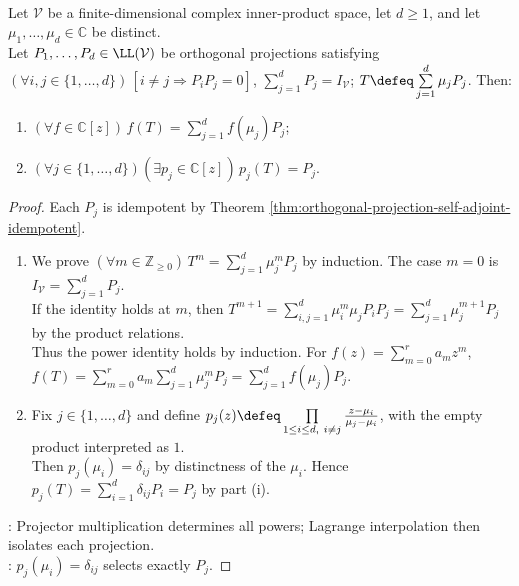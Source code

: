 \begin{corollary} \label{cor:normal-spectral-resolution-functional-calculus} \\
Let $\mathcal{V}$ be a finite-dimensional complex inner-product space, let $d\geq1$, and let $\mu_1,\ldots,\mu_d\in\mathbb{C}$ be distinct.\\
Let $P_1,\ldots,P_d\in\LL(\mathcal{V})$ be orthogonal projections satisfying $(\forall i,j\in\{1,\ldots,d\})\,[i\neq j\Longrightarrow P_iP_j=0]$, $\sum\limits_{j=1}^{d}P_j=I_{\mathcal{V}}$; $T\defeq\sum\limits_{j=1}^{d}\mu_jP_j$. Then:
\begin{enumerate}[label=(\roman*)]
\setlength{\itemsep}{0pt}
\item $(\forall f\in\mathbb{C}[z])\,f(T)=\sum\limits_{j=1}^{d}f(\mu_j)P_j$;
\item $(\forall j\in\{1,\ldots,d\})(\exists p_j\in\mathbb{C}[z])\,p_j(T)=P_j$.
\end{enumerate}
\begin{proof}
Each $P_j$ is idempotent by Theorem \ref{thm:orthogonal-projection-self-adjoint-idempotent}.
\begin{enumerate}[label=(\roman*)]
\setlength{\itemsep}{0pt}
\item We prove $(\forall m\in\mathbb{Z}_{\geq0})\,T^m=\sum\limits_{j=1}^{d}\mu_j^mP_j$ by induction. The case $m=0$ is $I_{\mathcal{V}}=\sum\limits_{j=1}^{d}P_j$.\\
If the identity holds at $m$, then $T^{m+1}=\sum\limits_{i,j=1}^{d}\mu_i^m\mu_jP_iP_j=\sum\limits_{j=1}^{d}\mu_j^{m+1}P_j$ by the product relations.\\
Thus the power identity holds by induction. For $f(z)=\sum\limits_{m=0}^{r}a_mz^m$, $f(T)=\sum\limits_{m=0}^{r}a_m\sum\limits_{j=1}^{d}\mu_j^mP_j=\sum\limits_{j=1}^{d}f(\mu_j)P_j$.
\item Fix $j\in\{1,\ldots,d\}$ and define $p_j(z)\defeq\prod\limits_{1\leq i\leq d,\ i\neq j}\frac{z-\mu_i}{\mu_j-\mu_i}$, with the empty product interpreted as $1$.\\
Then $p_j(\mu_i)=\delta_{ij}$ by distinctness of the $\mu_i$. Hence $p_j(T)=\sum\limits_{i=1}^{d}\delta_{ij}P_i=P_j$ by part (i).
\end{enumerate}
: Projector multiplication determines all powers; Lagrange interpolation then isolates each projection.\\
: $p_j(\mu_i)=\delta_{ij}$ selects exactly $P_j$.
\end{proof}
\end{corollary}
